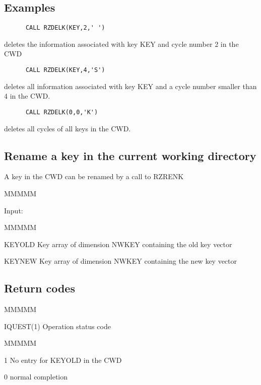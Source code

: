 \subsection{Examples}
\begin{verbatim}
      CALL RZDELK(KEY,2,' ')
\end{verbatim}
deletes the information associated with key KEY and cycle number 2 in
the CWD
\begin{verbatim}
      CALL RZDELK(KEY,4,'S')
\end{verbatim}
deletes all information associated with key KEY
and a cycle number smaller than 4 in the CWD.
\begin{verbatim}
      CALL RZDELK(0,0,'K')
\end{verbatim}
deletes all cycles of all keys in the CWD.
\subsection{Rename a key in the current working directory}
\par A key in the CWD can be renamed by a call to RZRENK
\begin{DL}{MMMMM}
\item[Input:
]
\begin{DL}{MMMMM}
\item[KEYOLD
]Key array of dimension NWKEY containing the old key vector
\item[KEYNEW
]Key array of dimension NWKEY containing the new key vector
\end{DL}
\end{DL}
\subsection{Return codes}
\par
\begin{DL}{MMMMM}
\item[IQUEST(1)
]Operation status code
\begin{DL}{MMMMM}
\item[ 1
]No entry for KEYOLD in the CWD
\item[ 0
]normal completion
\end{DL}
\end{DL}
